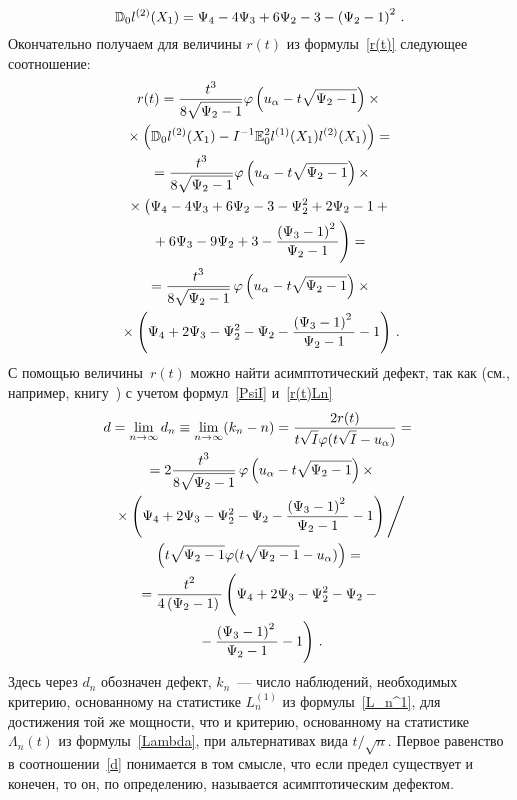 \begin{multicols}{2}
\vspace*{-6pt}
\noindent
$$
\mathbb D_0 l^{(2)}(X_1)=\Psi_4-4\Psi_3+6\Psi_2-3-\left(\Psi_2-1\right)^2\,.
$$
Окончательно получаем для величины $r(t)$ из формулы~\eqref{r(t)}
следующее соотношение:
\begin{multline}
r(t)=\displaystyle\frac{\displaystyle t^3\mathstrut}{\displaystyle 8\sqrt{\Psi_2-1}\mathstrut}\varphi\left(u_\alpha-t\sqrt{\Psi_2-1}\right)\times{}\\
{}\times\left(\mathbb D_0
l^{(2)}(X_1)-I^{-1}\mathbb E_0^2 l^{(1)}(X_1)l^{(2)}(X_1)\right)={}\\
{}=\displaystyle\frac{\displaystyle t^3\mathstrut}{\displaystyle 8\sqrt{\Psi_2-1}\mathstrut}\varphi\left(u_\alpha-t\sqrt{\Psi_2-1}\right)\times
\\
{}\times\left(\Psi_4-4\Psi_3+6\Psi_2-3-\Psi^2_2+2\Psi_2-1+{}\right.\\
\left.{}+6\Psi_3-9\Psi_2+3
-\displaystyle\frac{\displaystyle \left(\Psi_3-1\right)^2\mathstrut}{\displaystyle \Psi_2-1\mathstrut}\right)={}\\
{}=
\displaystyle\frac{\displaystyle t^3\mathstrut}{\displaystyle 8\sqrt{\Psi_2-1}\mathstrut}\,\varphi\left(u_\alpha-t\sqrt{\Psi_2-1}\right)\times{}\\
{}\times
\left(\Psi_4+2\Psi_3-\Psi^2_2-\Psi_2-\displaystyle\frac{\displaystyle \left(\Psi_3-1\right)^2\mathstrut}{\displaystyle \Psi_2-1\mathstrut}-1\right)\,.
\label{r(t)Ln}
\end{multline}
С помощью величины~$r(t)$ можно найти асимптотический дефект, так
как (см., например, книгу~\cite{Bening2000}) с учетом формул~\eqref{PsiI}
и~\eqref{r(t)Ln}
\begin{multline}
d=\lim\limits_{n\to\infty}
d_n\equiv\lim\limits_{n\to\infty}(k_n-n)=
\fr{2r(t)}{t\sqrt{I}\varphi(t\sqrt{I}-u_\alpha)}={}\\
{}=2\fr{t^3}{8\sqrt{\Psi_2-1}}\,\varphi
\left(u_\alpha-t\sqrt{\Psi_2-1}\right)\times\\
{}\times
\left(\Psi_4+2\Psi_3-\Psi^2_2-\Psi_2-\fr{\left(\Psi_3-1\right)^2}{\Psi_2-1}-1\right)\Bigg /{}\\
{}
\left(t\sqrt{\Psi_2-1}\varphi(t\sqrt{\Psi_2-1}-u_\alpha)\right)={}\\
{}=\fr{t^2}{4\left(\Psi_2-1\right)}
\left(\vphantom{\fr{\left(\Psi_3-1\right)^2}{\Psi_2-1}}
\Psi_4+2\Psi_3-\Psi^2_2-\Psi_2-{}\right.\\
\left.{}-\fr{\left(\Psi_3-1\right)^2}{\Psi_2-1}-1\right)\,.
\label{d}
\end{multline}
Здесь через $d_n$ обозначен дефект, $k_n$~--- число наблюдений,
необходимых критерию, основанному на статистике $L_n^{(1)}$ из
формулы~\eqref{L_n^1}, для достижения той же мощности, что и
критерию, основанному на статистике $\Lambda_n(t)$ из
формулы~\eqref{Lambda}, при альтернативах вида $t/\sqrt{n}$. Первое
равенство в соотношении~\eqref{d} понимается в том смысле, что если
предел существует и конечен, то он, по определению, называется
асимптотическим дефектом.


\end{multicols}
